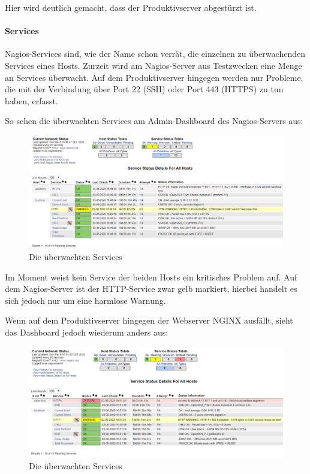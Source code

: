 Hier wird deutlich gemacht, dass der Produktivserver abgestürzt ist.

\hypertarget{services}{%
\paragraph{Services}\label{services}}

Nagios-Services sind, wie der Name schon verrät, die einzelnen zu
überwachenden Services eines Hosts. Zurzeit wird am Nagios-Server aus
Testzwecken eine Menge an Services überwacht. Auf dem Produktivserver
hingegen werden nur Probleme, die mit der Verbindung über Port 22 (SSH)
oder Port 443 (HTTPS) zu tun haben, erfasst.

So sehen die überwachten Services am Admin-Dashboard des Nagios-Servers
aus:

\begin{figure}[ht]
\centering
\includegraphics{services.png}
\caption{Die überwachten Services}
\end{figure}

Im Moment weist kein Service der beiden Hosts ein kritisches Problem
auf. Auf dem Nagios-Server ist der HTTP-Service zwar gelb markiert,
hierbei handelt es sich jedoch nur um eine harmlose Warnung.

Wenn auf dem Produktivserver hingegen der Webserver NGINX ausfällt,
sieht das Dashboard jedoch wiederum anders aus:

\begin{figure}[ht]
\centering
\includegraphics{dednginx.png}
\caption{Die überwachten Services}
\end{figure}

